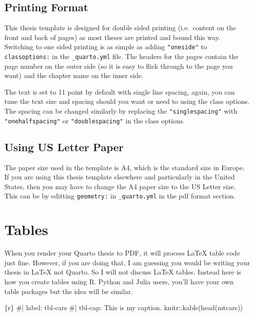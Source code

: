 \documentclass[
  letterpaper,
  11pt,
  english,
  singlespacing,
  headsepline]{MastersDoctoralThesis}
\newenvironment{Shaded}{\begin{snugshade}}{\end{snugshade}}
\newcommand{\InformationTok}[1]{\textcolor[rgb]{0.37,0.37,0.37}{#1}}
\begin{document}
\subsection{Printing Format}\label{printing-format}

This thesis template is designed for double sided printing (i.e.~content
on the front and back of pages) as most theses are printed and bound
this way. Switching to one sided printing is as simple as adding
\texttt{"oneside"} to \texttt{classoptions:} in the
\texttt{\_quarto.yml} file. The headers for the pages contain the page
number on the outer side (so it is easy to flick through to the page you
want) and the chapter name on the inner side.

The text is set to 11 point by default with single line spacing, again,
you can tune the text size and spacing should you want or need to using
the class options. The spacing can be changed similarly by replacing the
\texttt{"singlespacing"} with \texttt{"onehalfspacing"} or
\texttt{"doublespacing"} in the class options.

\subsection{Using US Letter Paper}\label{using-us-letter-paper}

The paper size used in the template is A4, which is the standard size in
Europe. If you are using this thesis template elsewhere and particularly
in the United States, then you may have to change the A4 paper size to
the US Letter size. This can be by editting \texttt{geometry:} in
\texttt{\_quarto.yml} in the pdf format section.

\section{Tables}\label{tables}

When you render your Quarto thesis to PDF, it will process \LaTeX{}
table code just fine. However, if you are doing that, I am guessing you
would be writing your thesis in \LaTeX{} not Quarto. So I will not
discuss \LaTeX{} tables. Instead here is how you create tables using R.
Python and Julia users, you'll have your own table packages but the idea
will be similar.

\begin{Shaded}
\begin{Highlighting}[]
\InformationTok{\textasciigrave{}\textasciigrave{}\textasciigrave{}\{r\}}
\InformationTok{\#| label: tbl{-}cars}
\InformationTok{\#| tbl{-}cap: This is my caption.}
\InformationTok{knitr::kable(head(mtcars))}
\InformationTok{\textasciigrave{}\textasciigrave{}\textasciigrave{}}
\end{Highlighting}
\end{Shaded}
\end{document}
